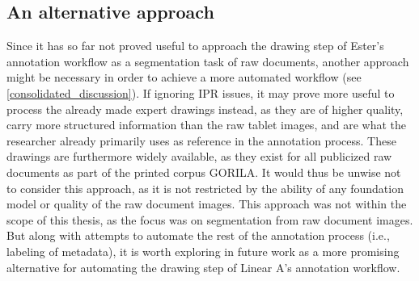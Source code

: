 \subsection{An alternative approach}
Since it has so far not proved useful to approach the drawing step of Ester's annotation workflow as a segmentation task of raw documents, another approach might be necessary in order to achieve a more automated workflow (see \cref{consolidated_discussion}).
If ignoring \acs{IPR} issues, it may prove more useful to process the already made expert drawings instead, as they are of higher quality, carry more structured information than the raw tablet images, and are what the researcher already primarily uses as reference in the annotation process.
These drawings are furthermore widely available, as they exist for all publicized raw documents as part of the printed corpus \acs{GORILA}.
It would thus be unwise not to consider this approach, as it is not restricted by the ability of any foundation model or quality of the raw document images.
This approach was not within the scope of this thesis, as the focus was on segmentation from raw document images.
But along with attempts to automate the rest of the annotation process (i.e., labeling of metadata), it is worth exploring in future work as a more promising alternative for automating the drawing step of Linear A's annotation workflow. 